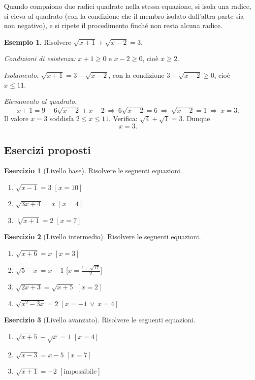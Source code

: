 \documentclass[12pt,a4paper,openany]{book}
\theoremstyle{definition}
\newtheorem{esempio}{Esempio}[section]
\newtheorem{esercizio}{Esercizio}[section]
\theoremstyle{plain}
\theoremstyle{remark}
\begin{document}
Quando compaiono due radici quadrate nella stessa equazione, si isola una radice, si eleva al quadrato (con la condizione che il membro isolato dall'altra parte sia non negativo), e si ripete il procedimento finché non resta alcuna radice.

\begin{esempio}
Risolvere $\sqrt{x+1}+\sqrt{x-2}=3$.

\emph{Condizioni di esistenza:} $x+1\ge 0$ e $x-2\ge 0$, cioè $x\ge 2$.

\emph{Isolamento.} $\sqrt{x+1}=3-\sqrt{x-2}$, con la condizione $3-\sqrt{x-2}\ge 0$, cioè $x\le 11$.

\emph{Elevamento al quadrato.}
\[
x+1=9-6\sqrt{x-2}+x-2\ \Longrightarrow\ 6\sqrt{x-2}=6\ \Longrightarrow\ \sqrt{x-2}=1\ \Longrightarrow\ x=3.
\]
Il valore $x=3$ soddisfa $2\le x\le 11$. Verifica: $\sqrt4+\sqrt1=3$. Dunque
\[
x=3.
\]
\end{esempio}

\subsection*{Esercizi proposti}

\begin{esercizio}[Livello base]
Risolvere le seguenti equazioni.
\begin{enumerate}[label=\alph*)]
\item $\sqrt{x-1}=3$ \hfill $[x=10]$
\item $\sqrt{3x+4}=x$ \hfill $[x=4]$
\item $\sqrt[3]{x+1}=2$ \hfill $[x=7]$
\end{enumerate}
\end{esercizio}

\begin{esercizio}[Livello intermedio]
Risolvere le seguenti equazioni.
\begin{enumerate}[label=\alph*)]
\item $\sqrt{x+6}=x$ \hfill $[x=3]$
\item $\sqrt{5-x}=x-1$ \hfill $\bigl[x=\tfrac{1+\sqrt{17}}{2}\bigr]$
\item $\sqrt{2x+3}=\sqrt{x+5}$ \hfill $[x=2]$
\item $\sqrt{x^2-3x}=2$ \hfill $[x=-1\ \lor\ x=4]$
\end{enumerate}
\end{esercizio}

\begin{esercizio}[Livello avanzato]
Risolvere le seguenti equazioni.
\begin{enumerate}[label=\alph*)]
\item $\sqrt{x+5}-\sqrt{x}=1$ \hfill $[x=4]$
\item $\sqrt{x-3}=x-5$ \hfill $[x=7]$
\item $\sqrt{x+1}=-2$ \hfill $[\text{impossibile}]$
\end{enumerate}
\end{esercizio}
\end{document}
